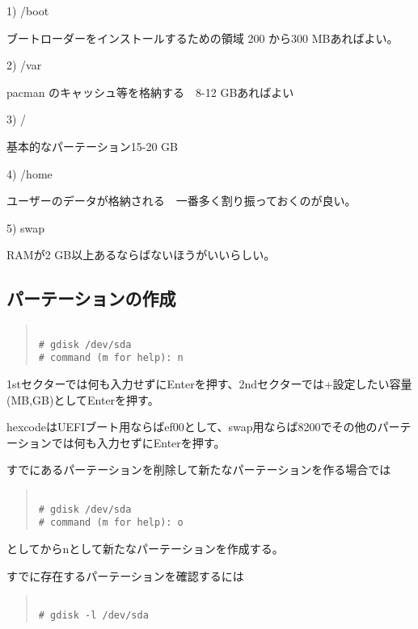 \documentclass[dvipdfmx]{jsarticle}
\begin{document}
1) /boot 

ブートローダーをインストールするための領域 200 から300 MBあればよい。

2) /var 

pacman のキャッシュ等を格納する　8-12 GBあればよい

3) /

基本的なパーテーション15-20 GB

4) /home

ユーザーのデータが格納される　一番多く割り振っておくのが良い。

5) swap

RAMが2 GB以上あるならばないほうがいいらしい。

\subsection{パーテーションの作成}

\begin{quote}
\begin{verbatim}

# gdisk /dev/sda
# command (m for help): n

\end{verbatim}
\end{quote}

1stセクターでは何も入力せずにEnterを押す、2ndセクターでは+\<設定したい容量\>(MB,GB)としてEnterを押す。


hexcodeはUEFIブート用ならばef00として、swap用ならば8200でその他のパーテーションでは何も入力セずにEnterを押す。



すでにあるパーテーションを削除して新たなパーテーションを作る場合では

\begin{quote}
\begin{verbatim}

# gdisk /dev/sda
# command (m for help): o

\end{verbatim}
\end{quote}

としてからnとして新たなパーテーションを作成する。


すでに存在するパーテーションを確認するには

\begin{quote}
\begin{verbatim}

# gdisk -l /dev/sda

\end{verbatim}
\end{quote}
\end{document}
